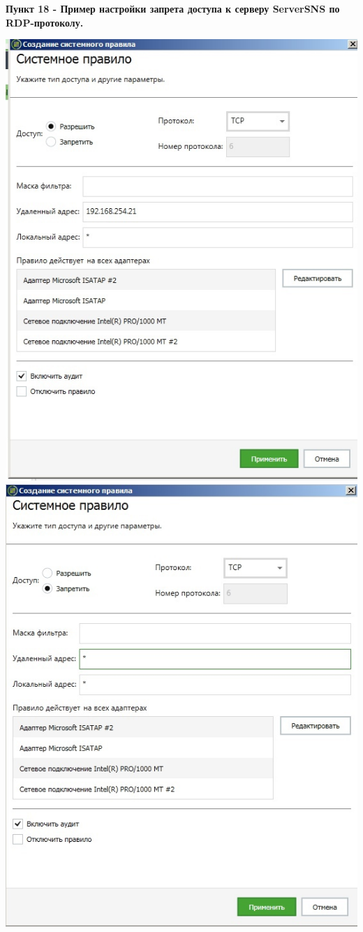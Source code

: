 \documentclass[a4paper,14pt]{extarticle}
\begin{document}
    \textbf{Пункт 18 - Пример настройки запрета доступа к серверу ServerSNS по RDP-протоколу.}
    \begin{center}
        \begin{multicols}{2}
            \includegraphics[scale=0.4]{pics/18_1.jpg}
            \includegraphics[scale=0.4]{pics/18_2.jpg}

\end{multicols}
\end{center}
\end{document}

